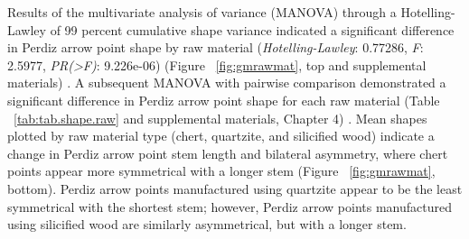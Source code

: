 \documentclass[review]{elsarticle}
\begin{document}
Results of the multivariate analysis of variance (MANOVA) through a Hotelling-Lawley of 99 percent cumulative shape variance indicated a significant difference in Perdiz arrow point shape by raw material (\textit{Hotelling-Lawley}: 0.77286, \textit{F}: 2.5977, \textit{PR(>F)}: 9.226e-06) (Figure ~\ref{fig:gmrawmat}, top and supplemental materials) \citep[Chapter 4]{RN8980}. A subsequent MANOVA with pairwise comparison demonstrated a significant difference in Perdiz arrow point shape for each raw material (Table ~\ref{tab:tab.shape.raw} and supplemental materials, Chapter 4) \citep{RN8980}. Mean shapes plotted by raw material type (chert, quartzite, and silicified wood) indicate a change in Perdiz arrow point stem length and bilateral asymmetry, where chert points appear more symmetrical with a longer stem (Figure ~\ref{fig:gmrawmat}, bottom). Perdiz arrow points manufactured using quartzite appear to be the least symmetrical with the shortest stem; however, Perdiz arrow points manufactured using silicified wood are similarly asymmetrical, but with a longer stem.
\end{document}
